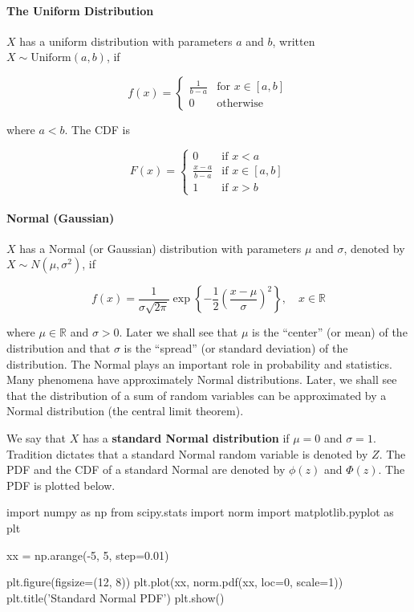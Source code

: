 \paragraph{The Uniform Distribution}\label{the-uniform-distribution}

\(X\) has a uniform distribution with parameters \(a\) and \(b\),
written \(X \sim \text{Uniform}(a, b)\), if

\[ f(x) = \begin{cases}
\frac{1}{b - a} &\text{for } x \in [a, b] \\
0 &\text{otherwise}
\end{cases}\]

where \(a < b\). The CDF is

\[ F(x) = \begin{cases}
0 &\text{if } x < a \\
\frac{x - a}{b - a} &\text{if } x \in [a, b] \\
1 &\text{if } x > b
\end{cases} \]

\paragraph{Normal (Gaussian)}\label{normal-gaussian}

\(X\) has a Normal (or Gaussian) distribution with parameters \(\mu\)
and \(\sigma\), denoted by \(X \sim N(\mu, \sigma^2)\), if

\[ f(x) = \frac{1}{\sigma \sqrt{2 \pi}} \exp \left\{ -\frac{1}{2} \left( \frac{x - \mu}{\sigma} \right)^2\right\}, \quad x \in \mathbb{R} \]

where \(\mu \in \mathbb{R}\) and \(\sigma > 0\). Later we shall see that
\(\mu\) is the ``center'' (or mean) of the distribution and that
\(\sigma\) is the ``spread'' (or standard deviation) of the
distribution. The Normal plays an important role in probability and
statistics. Many phenomena have approximately Normal distributions.
Later, we shall see that the distribution of a sum of random variables
can be approximated by a Normal distribution (the central limit
theorem).

We say that \(X\) has a \textbf{standard Normal distribution} if
\(\mu = 0\) and \(\sigma = 1\). Tradition dictates that a standard
Normal random variable is denoted by \(Z\). The PDF and the CDF of a
standard Normal are denoted by \(\phi(z)\) and \(\Phi(z)\). The PDF is
plotted below.

\begin{python}
import numpy as np
from scipy.stats import norm
import matplotlib.pyplot as plt

xx = np.arange(-5, 5, step=0.01)

plt.figure(figsize=(12, 8))
plt.plot(xx, norm.pdf(xx, loc=0, scale=1))
plt.title('Standard Normal PDF')
plt.show()
\end{python}

